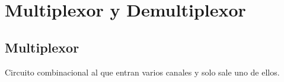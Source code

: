 \documentclass[11pt,fleqn]{book} %
\begin{document}
\section{Multiplexor y Demultiplexor}
\subsection{Multiplexor}
Circuito combinacional al que entran varios canales y solo sale uno de ellos.

\end{document}
